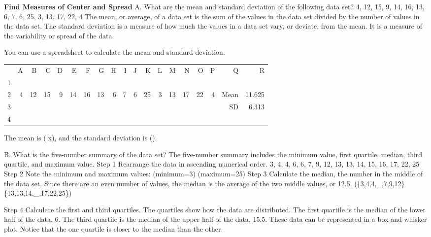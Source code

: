 \documentclass{article}
\newenvironment{example}[1]{}{}         %
\newcommand{\answer}[1]{}               %
\newcommand{\te}[1]{}                   %
\begin{document}
\begin{example}{1}
\textbf{Find Measures of Center and Spread}
A. What are the mean and standard deviation of the following data set?
4, 12, 15, 9, 14, 16, 13, 6, 7, 6, 25, 3, 13, 17, 22, 4
The mean, or average, of a data set is the sum of the values in the data set divided by the number of values in the data set. The standard deviation is a measure of how much the values in a data set vary, or deviate, from the mean. It is a measure of the variability or spread of the data.
\te{Callout: The mean and the standard deviation are used together to measure the center and spread of the data.}
You can use a spreadsheet to calculate the mean and standard deviation.
\te{STUDY TIP Most technology has the ability to calculate mean and standard deviation.}
\begin{tabular}{rrrrrrrrrrrrrrrrrrr}
 & A & B & C & D & E & F & G & H & I & J & K & L & M & N & O & P & Q & R \\
1 & & & & & & & & & & & & & & & & & & \\
2 & 4 & 12 & 15 & 9 & 14 & 16 & 13 & 6 & 7 & 6 & 25 & 3 & 13 & 17 & 22 & 4 & Mean & 11.625 \\
3 & & & & & & & & & & & & & & & & & SD & 6.313 \\
4 & & & & & & & & & & & & & & & & & & \\
\end{tabular}
The mean is (\bar{x}), and the standard deviation is (\sigma{}).
\answer{A. (\bar{x}\approx11.6); (\sigma\approx6.3).}
B. What is the five-number summary of the data set?
The five-number summary includes the minimum value, first quartile, median, third quartile, and maximum value.
Step 1 Rearrange the data in ascending numerical order.
3, 4, 4, 6, 6, 7, 9, 12, 13, 13, 14, 15, 16, 17, 22, 25
Step 2 Note the minimum and maximum values:
(minimum=3)
(maximum=25)
Step 3 Calculate the median, the number in the middle of the data set. Since there are an even number of values, the median is the average of the two middle values, or 12.5.
(\{3,4,4,_{},7,9,12\}\quad\{13,13,14,_{},17,22,25\})
\te{The values 12 and 13 on either side of the group division are blue and labeled median.}
Step 4 Calculate the first and third quartiles. The quartiles show how the data are distributed. The first quartile is the median of the lower half of the data, 6. The third quartile is the median of the upper half of the data, 15.5.
These data can be represented in a box-and-whisker plot. Notice that the one quartile is closer to the median than the other.

\end{example}
\end{document}
